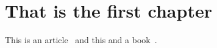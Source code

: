 \chapter{That is the first chapter}
\label{chap:first}
 
This is an article~\cite{granger2011thermodynamic} and this and a book~\cite{nelson1985quantum}. 

\lipsum[1-2]

\lipsum[3-5]